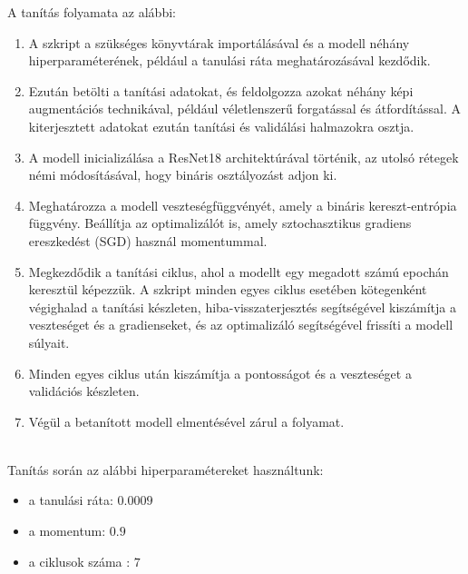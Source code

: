 \documentclass[12pt,a4]{article}
\begin{document}
                    A tanítás folyamata az alábbi: 
                        \begin{enumerate}
                            \item A szkript a szükséges könyvtárak importálásával és a modell néhány hiperparaméterének, például a tanulási ráta meghatározásával kezdődik.

                            \item Ezután betölti a tanítási adatokat, és feldolgozza azokat néhány képi augmentációs technikával, például véletlenszerű forgatással és átfordítással. A kiterjesztett adatokat ezután tanítási és validálási halmazokra osztja.

                            \item A modell inicializálása a ResNet18 architektúrával történik, az utolsó rétegek némi módosításával, hogy bináris osztályozást adjon ki. 

                            \item Meghatározza a modell veszteségfüggvényét, amely a bináris kereszt-entrópia függvény. Beállítja az optimalizálót is, amely sztochasztikus gradiens ereszkedést (SGD) használ momentummal.

                            \item Megkezdődik a tanítási ciklus, ahol a modellt egy megadott számú epochán keresztül képezzük. A szkript minden egyes ciklus esetében kötegenként végighalad a tanítási készleten, hiba-visszaterjesztés segítségével kiszámítja a veszteséget és a gradienseket, és az optimalizáló segítségével frissíti a modell súlyait.

                            \item Minden egyes ciklus után kiszámítja a pontosságot és a veszteséget a validációs készleten.

                            \item Végül a betanított modell elmentésével zárul a folyamat.
                        \end{enumerate}\\

                    Tanítás során az alábbi hiperparamétereket használtunk:
                        \begin{itemize}
                            \item a tanulási ráta: $0.0009$ 
                            \item a momentum: $0.9$
                            \item a ciklusok száma : $7$
                        \end{itemize}
\end{document}
